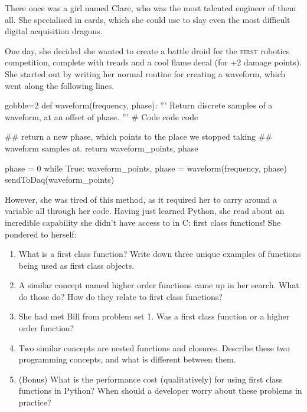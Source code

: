 \documentclass[10pt, letterpaper, acro-macros]{python-problem}
\begin{document}
There once was a girl named Clare, who was the most talented engineer of
them all. She specialised in \daq cards, which she could use to slay even
the most difficult digital acquisition dragons.

One day, she decided she wanted to create a battle droid for the
\textsc{first} robotics competition, complete with treads and a cool flame
decal (for +2 damage points). She started out by writing her normal \daq
routine for creating a waveform, which went along the following lines.

\begin{pycode*}{gobble=2}
  def waveform(frequency, phase):
      ''' Return discrete samples of a waveform, at an offset of phase.  '''
      # Code code code

      ## return a new phase, which points to the place we stopped taking
      ## waveform samples at.
      return waveform_points, phase

  phase = 0
  while True:
      waveform_points, phase = waveform(frequency, phase)
      sendToDaq(waveform_points)
\end{pycode*}

However, she was tired of this method, as it required her to carry around a
variable all through her code. Having just learned Python, she read about an
incredible capability she didn't have access to in C: first class functions!
She pondered to herself:

\begin{enumerate}
  \item What is a first class function? Write down three unique examples of
        functions being used as first class objects.

  \item A similar concept named higher order functions came up in her search.
        What do those do? How do they relate to first class functions?

  \item She had met Bill from problem set 1. Was  a first
        class function or a higher order function?

  \item Two similar concepts are nested functions and closures. Describe
        these two programming concepts, and what is different between them.

  \item (Bonus) What is the performance cost (qualitatively) for using
        first class functions in Python? When should a developer worry about
        these problems in practice?
\end{enumerate}
\end{document}
